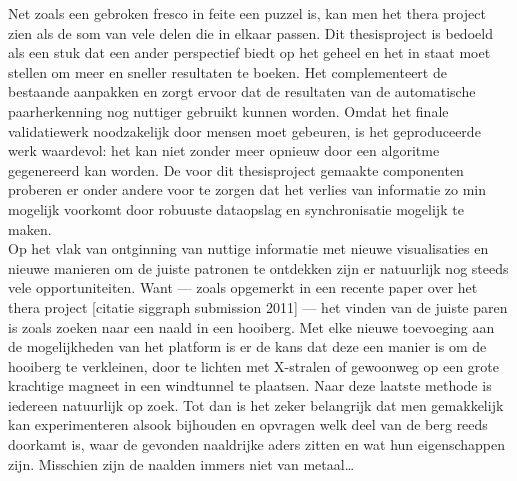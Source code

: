 Net zoals een gebroken fresco in feite een puzzel is, kan men het thera project zien als de som van vele delen die in elkaar passen. Dit thesisproject is bedoeld als een stuk dat een ander perspectief biedt op het geheel en het in staat moet stellen om meer en sneller resultaten te boeken. Het complementeert de bestaande aanpakken en zorgt ervoor dat de resultaten van de automatische paarherkenning nog nuttiger gebruikt kunnen worden. Omdat het finale validatiewerk noodzakelijk door mensen moet gebeuren, is het geproduceerde werk waardevol: het kan niet zonder meer opnieuw door een algoritme gegenereerd kan worden. De voor dit thesisproject gemaakte componenten proberen er onder andere voor te zorgen dat het verlies van informatie zo min mogelijk voorkomt door robuuste dataopslag en synchronisatie mogelijk te maken.\\

Op het vlak van ontginning van nuttige informatie met nieuwe visualisaties en nieuwe manieren om de juiste patronen te ontdekken zijn er natuurlijk nog steeds vele opportuniteiten. Want --- zoals opgemerkt in een recente paper over het thera project [citatie siggraph submission 2011] --- het vinden van de juiste paren is zoals zoeken naar een naald in een hooiberg. Met elke nieuwe toevoeging aan de mogelijkheden van het platform is er de kans dat deze een manier is om de hooiberg te verkleinen, door te lichten met X-stralen of gewoonweg op een grote krachtige magneet in een windtunnel te plaatsen. Naar deze laatste methode is iedereen natuurlijk op zoek. Tot dan is het zeker belangrijk dat men gemakkelijk kan experimenteren alsook bijhouden en opvragen welk deel van de berg reeds doorkamt is, waar de gevonden naaldrijke aders zitten en wat hun eigenschappen zijn. Misschien zijn de naalden immers niet van metaal\ldots
